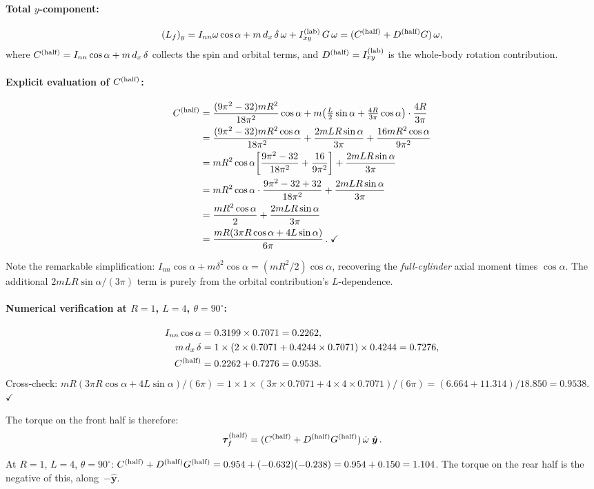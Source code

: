 \documentclass[11pt]{article}
\newcommand{\vect}[1]{\bm{#1}}
\newcommand{\uv}[1]{\hat{\bm{#1}}}
\newcommand{\yhat}{\uv{y}}
\begin{document}
\paragraph{Total $y$-component:}
\begin{equation}
(L_f)_y = I_{nn}\omega\cos\alpha + m\,d_x\,\delta\,\omega
  + I_{xy}^{(\rm lab)}\,G\,\omega
= (C^{(\rm half)}+D^{(\rm half)}G)\,\omega,
\end{equation}
where $C^{(\rm half)}=I_{nn}\cos\alpha+m\,d_x\,\delta$ collects
the spin and orbital terms, and $D^{(\rm half)}=I_{xy}^{(\rm lab)}$
is the whole-body rotation contribution.

\paragraph{Explicit evaluation of $C^{(\rm half)}$:}
\begin{align}
C^{(\rm half)}
&= \frac{(9\pi^2-32)mR^2}{18\pi^2}\cos\alpha
  +m\bigl(\tfrac{L}{2}\sin\alpha+\tfrac{4R}{3\pi}\cos\alpha\bigr)
  \cdot\frac{4R}{3\pi} \\
&= \frac{(9\pi^2-32)mR^2\cos\alpha}{18\pi^2}
  +\frac{2mLR\sin\alpha}{3\pi}
  +\frac{16mR^2\cos\alpha}{9\pi^2} \\
&= mR^2\cos\alpha\biggl[\frac{9\pi^2-32}{18\pi^2}+\frac{16}{9\pi^2}\biggr]
  +\frac{2mLR\sin\alpha}{3\pi} \\
&= mR^2\cos\alpha\cdot\frac{9\pi^2-32+32}{18\pi^2}
  +\frac{2mLR\sin\alpha}{3\pi} \\
&= \frac{mR^2\cos\alpha}{2}+\frac{2mLR\sin\alpha}{3\pi} \\
&= \frac{mR(3\pi R\cos\alpha+4L\sin\alpha)}{6\pi}\,.\;\checkmark
\end{align}

Note the remarkable simplification: $I_{nn}\cos\alpha+m\delta^2\cos\alpha
=(mR^2/2)\cos\alpha$, recovering the \emph{full-cylinder} axial moment
times $\cos\alpha$.  The additional $2mLR\sin\alpha/(3\pi)$ term is
purely from the orbital contribution's $L$-dependence.

\paragraph{Numerical verification at $R=1$, $L=4$, $\theta=90^\circ$:}
\begin{align}
I_{nn}\cos\alpha &= 0.3199\times0.7071 = 0.2262, \\
m\,d_x\,\delta &= 1\times(2\times0.7071+0.4244\times0.7071)\times0.4244
  = 0.7276, \\
C^{(\rm half)} &= 0.2262+0.7276 = 0.9538.
\end{align}
Cross-check: $mR(3\pi R\cos\alpha+4L\sin\alpha)/(6\pi)
=1\times1\times(3\pi\times0.7071+4\times4\times0.7071)/(6\pi)
=(6.664+11.314)/18.850=0.9538$.~$\checkmark$

The torque on the front half is therefore:
\begin{equation}
\vect{\tau}_f^{(\rm half)}
= (C^{(\rm half)}+D^{(\rm half)}G^{(\rm half)})\,\dot\omega\;\yhat\,.
\end{equation}

At $R=1$, $L=4$, $\theta=90^\circ$:
$C^{(\rm half)}+D^{(\rm half)}G^{(\rm half)}=0.954+(-0.632)(-0.238)
=0.954+0.150=1.104$.  The torque on the rear half is the negative of
this, along~$-\yhat$.
\end{document}
